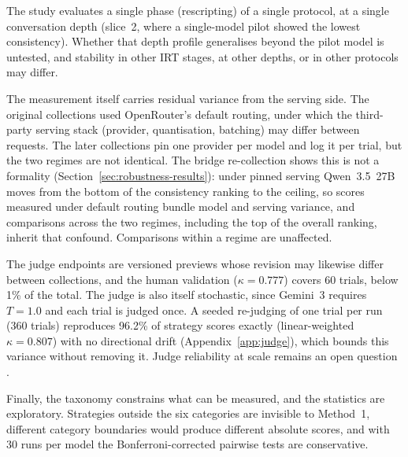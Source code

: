 The study evaluates a single phase (rescripting) of a single protocol, at a single conversation depth (slice~2, where a single-model pilot showed the lowest consistency). Whether that depth profile generalises beyond the pilot model is untested, and stability in other IRT stages, at other depths, or in other protocols may differ.

The measurement itself carries residual variance from the serving side. The original collections used OpenRouter's default routing, under which the third-party serving stack (provider, quantisation, batching) may differ between requests. The later collections pin one provider per model and log it per trial, but the two regimes are not identical. The bridge re-collection shows this is not a formality (Section~\ref{sec:robustness-results}): under pinned serving Qwen~3.5~27B moves from the bottom of the consistency ranking to the ceiling, so scores measured under default routing bundle model and serving variance, and comparisons across the two regimes, including the top of the overall ranking, inherit that confound. Comparisons within a regime are unaffected.

The judge endpoints are versioned previews whose revision may likewise differ between collections, and the human validation ($\kappa=0.777$) covers 60 trials, below 1\% of the total. The judge is also itself stochastic, since Gemini~3 requires $T{=}1.0$ and each trial is judged once. A seeded re-judging of one trial per run (360 trials) reproduces 96.2\% of strategy scores exactly (linear-weighted $\kappa=0.807$) with no directional drift (Appendix~\ref{app:judge}), which bounds this variance without removing it. Judge reliability at scale remains an open question \citep{zheng2023judging}.

Finally, the taxonomy constrains what can be measured, and the statistics are exploratory. Strategies outside the six categories are invisible to Method~1, different category boundaries would produce different absolute scores, and with 30 runs per model the Bonferroni-corrected pairwise tests are conservative.
